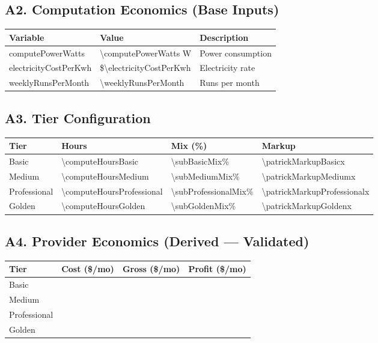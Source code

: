 \subsection*{A2. Computation Economics (Base Inputs)}
\begin{tabularx}{\linewidth}{l Y X}
\toprule
\textbf{Variable} & \textbf{Value} & \textbf{Description} \\\midrule
computePowerWatts & \num{\computePowerWatts} W & Power consumption \\
electricityCostPerKwh & \$\num{\electricityCostPerKwh} & Electricity rate \\
weeklyRunsPerMonth & \num{\weeklyRunsPerMonth} & Runs per month \\
\bottomrule
\end{tabularx}

\subsection*{A3. Tier Configuration}
\begin{tabularx}{\linewidth}{l Y Y Y}
\toprule
\textbf{Tier} & \textbf{Hours} & \textbf{Mix (\%)} & \textbf{Markup} \\\midrule
Basic & \num{\computeHoursBasic} & \num{\subBasicMix}\% & \num{\patrickMarkupBasic}x \\
Medium & \num{\computeHoursMedium} & \num{\subMediumMix}\% & \num{\patrickMarkupMedium}x \\
Professional & \num{\computeHoursProfessional} & \num{\subProfessionalMix}\% & \num{\patrickMarkupProfessional}x \\
Golden & \num{\computeHoursGolden} & \num{\subGoldenMix}\% & \num{\patrickMarkupGolden}x \\
\bottomrule
\end{tabularx}

\subsection*{A4. Provider Economics (Derived --- Validated)}
\begin{tabularx}{\linewidth}{l Y Y Y}
\toprule
\textbf{Tier} & \textbf{Cost (\$/mo)} & \textbf{Gross (\$/mo)} & \textbf{Profit (\$/mo)} \\\midrule
Basic & \validate{\patrickCostBasic}{\HCpatrickCostBasic} & \validate{\patrickGrossBasic}{\HCpatrickGrossBasic} & \validate{\patrickProfitBasic}{\HCpatrickProfitBasic} \\
Medium & \validate{\patrickCostMedium}{\HCpatrickCostMedium} & \validate{\patrickGrossMedium}{\HCpatrickGrossMedium} & \validate{\patrickProfitMedium}{\HCpatrickProfitMedium} \\
Professional & \validate{\patrickCostProfessional}{\HCpatrickCostProfessional} & \validate{\patrickGrossProfessional}{\HCpatrickGrossProfessional} & \validate{\patrickProfitProfessional}{\HCpatrickProfitProfessional} \\
Golden & \validate{\patrickCostGolden}{\HCpatrickCostGolden} & \validate{\patrickGrossGolden}{\HCpatrickGrossGolden} & \validate{\patrickProfitGolden}{\HCpatrickProfitGolden} \\
\bottomrule
\end{tabularx}

